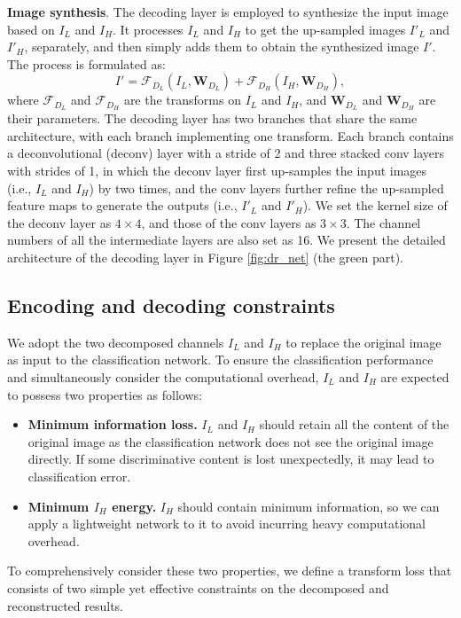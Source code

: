 \documentclass[letterpaper]{article} %
\begin{document}
\noindent\textbf{Image synthesis}.
The decoding layer is employed to synthesize the input image based on $I_L$ and $I_H$. It processes $I_L$ and $I_H$ to get the up-sampled images $I{'}_L$ and $I{'}_H$, separately, and then simply adds them to obtain the synthesized image $I{'}$. The process is formulated as:
\begin{equation}
   I' = \mathcal{F}_{D_L}(I_L, \mathbf{W}_{D_L}) + \mathcal{F}_{D_H}(I_H, \mathbf{W}_{D_H}),
\end{equation}
where $\mathcal{F}_{D_L}$ and $\mathcal{F}_{D_H}$ are the transforms on $I_L$ and $I_H$, and  $\mathbf{W}_{D_L}$ and $\mathbf{W}_{D_H}$ are their parameters. The decoding layer has two branches that share the same architecture, with each branch implementing one transform. Each branch contains a deconvolutional (deconv) layer with a stride of 2 and three stacked conv layers with strides of 1, in which the deconv layer first up-samples the input images (i.e., $I_L$ and $I_H$) by two times, and the conv layers further refine the up-sampled feature maps to generate the outputs (i.e., $I{'}_L$ and $I{'}_H$). We set the kernel size of the deconv layer as $4 \times 4$, and those of the conv layers as $3 \times 3$. The channel numbers of all the intermediate layers are also set as 16. We present the detailed architecture of the decoding layer in Figure \ref{fig:dr_net} (the green part).


\subsection{Encoding and decoding constraints}
We adopt the two decomposed channels $I_L$ and $I_H$ to replace the original image as input to the classification network.  To ensure the classification performance and simultaneously consider the computational overhead, $I_L$ and $I_H$ are expected to possess two properties as follows:
\begin{itemize}
  \item \textbf{Minimum information loss. } $I_L$ and $I_H$ should retain all the content of the original image as the classification network does not see the original image directly. If some discriminative content is lost unexpectedly, it may lead to classification error.
  \item \textbf{Minimum $I_H$ energy. } $I_H$ should contain minimum information, so we can apply a lightweight network to it to avoid incurring heavy computational overhead.
\end{itemize}
To comprehensively consider these two properties, we define a transform loss that consists of two simple yet effective constraints on the decomposed and reconstructed results.
\end{document}
